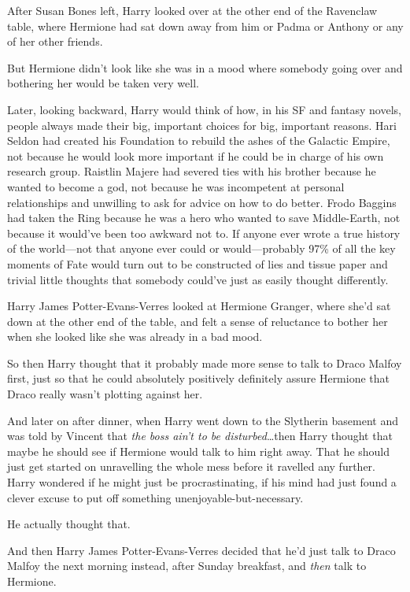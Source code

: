 After Susan Bones left, Harry looked over at the other end of the Ravenclaw table, where Hermione had sat down away from him or Padma or Anthony or any of her other friends.

But Hermione didn't look like she was in a mood where somebody going over and bothering her would be taken very well.

Later, looking backward, Harry would think of how, in his SF and fantasy novels, people always made their big, important choices for big, important reasons. Hari Seldon had created his Foundation to rebuild the ashes of the Galactic Empire, not because he would look more important if he could be in charge of his own research group. Raistlin Majere had severed ties with his brother because he wanted to become a god, not because he was incompetent at personal relationships and unwilling to ask for advice on how to do better. Frodo Baggins had taken the Ring because he was a hero who wanted to save Middle-Earth, not because it would've been too awkward not to. If anyone ever wrote a true history of the world—not that anyone ever could or would—probably 97\% of all the key moments of Fate would turn out to be constructed of lies and tissue paper and trivial little thoughts that somebody could've just as easily thought differently.

Harry James Potter-Evans-Verres looked at Hermione Granger, where she'd sat down at the other end of the table, and felt a sense of reluctance to bother her when she looked like she was already in a bad mood.

So then Harry thought that it probably made more sense to talk to Draco Malfoy first, just so that he could absolutely positively definitely assure Hermione that Draco really wasn't plotting against her.

And later on after dinner, when Harry went down to the Slytherin basement and was told by Vincent that \emph{the boss ain't to be disturbed}…then Harry thought that maybe he should see if Hermione would talk to him right away. That he should just get started on unravelling the whole mess before it ravelled any further. Harry wondered if he might just be procrastinating, if his mind had just found a clever excuse to put off something unenjoyable-but-necessary.

He actually thought that.

And then Harry James Potter-Evans-Verres decided that he'd just talk to Draco Malfoy the next morning instead, after Sunday breakfast, and \emph{then} talk to Hermione.

